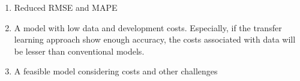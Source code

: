 \begin{enumerate}

 \item{Reduced RMSE and MAPE}
 \item{A model with low data and development costs. Especially, if the transfer learning approach show enough accuracy, the costs associated with data will be lesser than conventional models.}
 \item{A feasible model considering costs and other challenges}

\end{enumerate}
